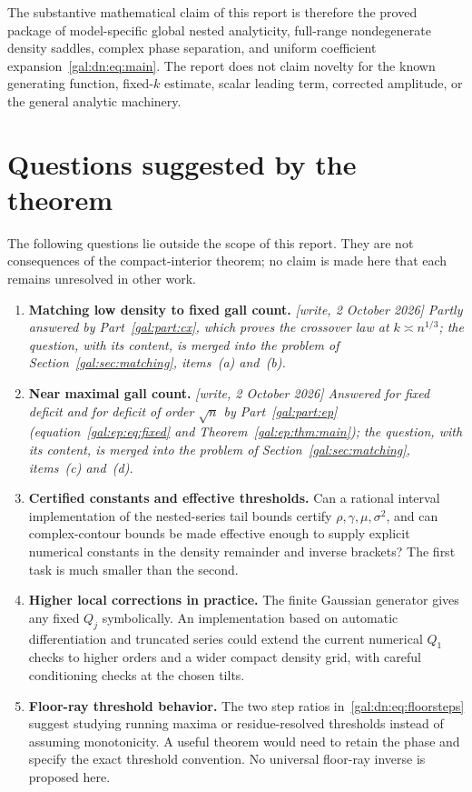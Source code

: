 \documentclass[11pt,letterpaper]{article}
\numberwithin{equation}{section}
\theoremstyle{definition}\newtheorem{definition}[theorem]{Definition}
\theoremstyle{remark}\newtheorem{remark}[theorem]{Remark}
\begin{document}
The substantive mathematical claim of this report is therefore the proved package of model-specific global nested analyticity, full-range nondegenerate density saddles, complex phase separation, and uniform coefficient expansion~\eqref{gal:dn:eq:main}. The report does not claim novelty for the known generating function, fixed-$k$ estimate, scalar leading term, corrected amplitude, or the general analytic machinery.

\section{Questions suggested by the theorem}\label{gal:dn:sec:questions}
The following questions lie outside the scope of this report. They are not consequences of the compact-interior theorem; no claim is made here that each remains unresolved in other work.
\begin{enumerate}[leftmargin=*,itemsep=5pt]
\item \textbf{Matching low density to fixed gall count.} \emph{[write, 2 October 2026] Partly answered by Part~\ref{gal:part:cx}, which proves the crossover law at $k\asymp n^{1/3}$; the question, with its content, is merged into the problem of Section~\ref{gal:sec:matching}, items~(a) and~(b).}
\item \textbf{Near maximal gall count.} \emph{[write, 2 October 2026] Answered for fixed deficit and for deficit of order $\sqrt n$ by Part~\ref{gal:part:ep} (equation~\eqref{gal:ep:eq:fixed} and Theorem~\ref{gal:ep:thm:main}); the question, with its content, is merged into the problem of Section~\ref{gal:sec:matching}, items~(c) and~(d).}
\item \textbf{Certified constants and effective thresholds.} Can a rational interval implementation of the nested-series tail bounds certify $\rho,\gamma,\mu,\sigma^2$, and can complex-contour bounds be made effective enough to supply explicit numerical constants in the density remainder and inverse brackets? The first task is much smaller than the second.
\item \textbf{Higher local corrections in practice.} The finite Gaussian generator gives any fixed $Q_j$ symbolically. An implementation based on automatic differentiation and truncated series could extend the current numerical $Q_1$ checks to higher orders and a wider compact density grid, with careful conditioning checks at the chosen tilts.
\item \textbf{Floor-ray threshold behavior.} The two step ratios in~\eqref{gal:dn:eq:floorsteps} suggest studying running maxima or residue-resolved thresholds instead of assuming monotonicity. A useful theorem would need to retain the phase and specify the exact threshold convention. No universal floor-ray inverse is proposed here.
\end{enumerate}
\end{document}

